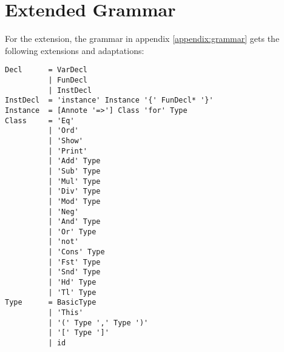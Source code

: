 \chapter{Extended Grammar}\label{appendix:grammar_extended}

For the extension, the grammar in appendix \ref{appendix:grammar} gets the following extensions and adaptations:

\begin{lstlisting}
Decl      = VarDecl
          | FunDecl
          | InstDecl
InstDecl  = 'instance' Instance '{' FunDecl* '}'
Instance  = [Annote '=>'] Class 'for' Type
Class     = 'Eq'
          | 'Ord'
          | 'Show'
          | 'Print'
          | 'Add' Type
          | 'Sub' Type
          | 'Mul' Type
          | 'Div' Type
          | 'Mod' Type
          | 'Neg'
          | 'And' Type
          | 'Or' Type
          | 'not'
          | 'Cons' Type
          | 'Fst' Type
          | 'Snd' Type
          | 'Hd' Type
          | 'Tl' Type
Type      = BasicType
          | 'This'
          | '(' Type ',' Type ')'
          | '[' Type ']'
          | id
\end{lstlisting}
